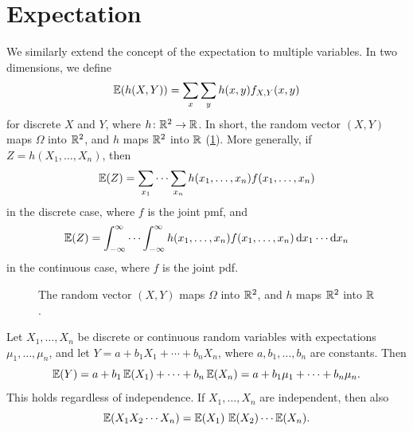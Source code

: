 \section{Expectation}\label{sec:joint-expectation}

We similarly extend the concept of the expectation to multiple variables. In two dimensions, we define
\[
  \operatorname{\mathbb{E}}(h(X, Y)) = \sum_x \sum_y h(x, y) f_{X,Y}(x, y)
\]
for discrete $X$ and $Y$, where $h \colon \mathbb{R}^2 \to \mathbb{R}$. In short, the random vector $(X, Y)$ maps $\Omega$ into $\mathbb{R}^2$, and $h$ maps $\mathbb{R}^2$ into $\mathbb{R}$ (\cref{fig:omega-to-r2-to-r}). More generally, if $Z = h(X_1, \ldots, X_n)$, then
\[
  \operatorname{\mathbb{E}}(Z) = \sum_{x_1} \cdots \sum_{x_n} h(x_1, \ldots, x_n) f(x_1, \ldots, x_n)
\]
in the discrete case, where $f$ is the joint pmf, and
\[
  \operatorname{\mathbb{E}}(Z) = \int_{-\infty}^\infty \cdots \int_{-\infty}^\infty h(x_1, \ldots, x_n) f(x_1, \ldots, x_n) \mathop{}\!\mathrm{d} x_1 \cdots \mathop{}\!\mathrm{d} x_n
\]
in the continuous case, where $f$ is the joint pdf.

\begin{figure}[H]
\centering
{}
\caption{The random vector $(X, Y)$ maps $\Omega$ into $\mathbb{R}^2$, and $h$ maps $\mathbb{R}^2$ into $\mathbb{R}$.}
\label{fig:omega-to-r2-to-r}
\end{figure}

\begin{theorem}\label{thm:joint-expectation-properties}
Let $X_1, \ldots, X_n$ be discrete or continuous random variables with expectations $\mu_1, \ldots, \mu_n$, and let $Y = a + b_1 X_1 + \cdots + b_n X_n$, where $a, b_1, \ldots, b_n$ are constants. Then
\[
  \operatorname{\mathbb{E}}(Y) = a + b_1 \operatorname{\mathbb{E}}(X_1) + \cdots + b_n \operatorname{\mathbb{E}}(X_n) = a + b_1 \mu_1 + \cdots + b_n \mu_n.
\]
This holds regardless of independence. If $X_1, \ldots, X_n$ are independent, then also
\[
  \operatorname{\mathbb{E}}(X_1 X_2 \cdots X_n) = \operatorname{\mathbb{E}}(X_1) \, \operatorname{\mathbb{E}}(X_2) \cdots \operatorname{\mathbb{E}}(X_n).
\]
\end{theorem}

